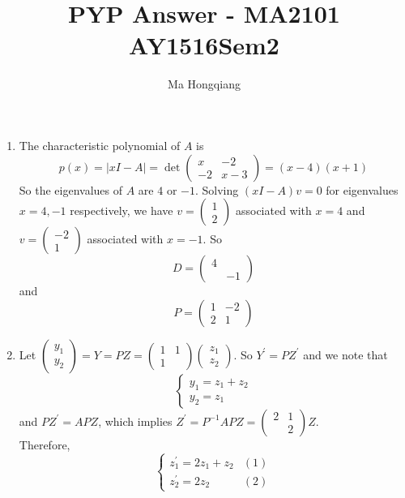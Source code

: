 \documentclass[12pt]{article}
\theoremstyle{definition}
\begin{document}
\title{PYP Answer - MA2101 AY1516Sem2}
\author{Ma Hongqiang}
\maketitle
\begin{enumerate}
\item The characteristic polynomial of $A$ is
\[
p(x)=|xI-A| = \det\begin{pmatrix}x&-2\\-2&x-3\end{pmatrix} = (x-4)(x+1)
\]
So the eigenvalues of $A$ are $4$ or $-1$. Solving $(xI-A)v=0$ for eigenvalues $x=4,-1$ respectively, we have $v=\begin{pmatrix}1\\2\end{pmatrix}$ associated with $x=4$ and $v=\begin{pmatrix}-2\\1\end{pmatrix}$ associated with $x=-1$. So
\[
D=\begin{pmatrix}4&\\&-1\end{pmatrix}
\]
and
\[
P=\begin{pmatrix}1&-2\\2&1\end{pmatrix}
\]
\item Let $\begin{pmatrix}y_1\\y_2\end{pmatrix} = Y=PZ=\begin{pmatrix}1&1\\1&\end{pmatrix}\begin{pmatrix} z_1\\z_2\end{pmatrix}$. So $Y^\prime = PZ^\prime$ and we note that
\[
\begin{cases}
y_1 = z_1+z_2\\
y_2 = z_1
\end{cases}
\]
and $PZ^\prime = APZ$, which implies $Z^\prime = P^{-1}APZ = \begin{pmatrix}2&1\\&2\end{pmatrix}Z$.\\
Therefore,
\[
\begin{cases}
z_1^\prime = 2z_1+z_2 &(1)\\
z_2^\prime = 2z_2&(2)
\end{cases}
\]
\end{enumerate}
\end{document}
